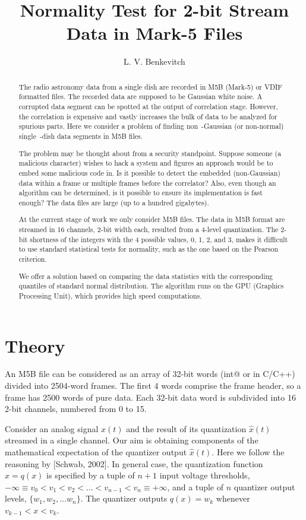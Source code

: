 \documentclass[letterpaper,twoside,12pt]{article}
\title{Normality Test for 2-bit Stream Data in Mark-5 Files}
\author[1]{L. V. Benkevitch}
\affil[1]{\small MIT Haystack observatory, Westford, MA 01886, USA.}
\begin{document}
\maketitle

\begin{abstract}
The radio astronomy data from a single dish are recorded in M5B (Mark-5) or VDIF formatted files. The recorded data are supposed to be Gaussian white noise. A corrupted data segment can be spotted at the output of correlation stage. However, the correlation is expensive and vastly increases the bulk of data to be analyzed for spurious parts. Here we consider a problem of finding non~-Gaussian (or non-normal) single~-dish data segments in M5B files.

The problem may be thought about from a security standpoint. Suppose someone (a malicious character) wishes to hack a system and figures an approach would be to embed some malicious code in. Is it possible to detect the embedded (non-Gaussian) data within a frame or multiple frames before the correlator? Also, even though an algorithm can be determined, is it possible to ensure its implementation is fast enough? The data files are large (up to a hundred gigabytes).

At the current stage of work we only consider M5B files. The data in M5B format are streamed in 16 channels, 2-bit width each, resulted from a 4-level quantization. The 2-bit shortness of the integers with the 4 possible values, 0, 1, 2, and 3, makes it difficult to use standard statistical tests for normality, such as the one based on the Pearson criterion.     
 
We offer a solution based on comparing the data statistics with the corresponding quantiles of standard normal distribution. The algorithm runs on the GPU (Graphics Processing Unit), which provides high speed computations.
\end{abstract}


\section{Theory}

An M5B file can be considered as an array of 32-bit words (\verb@unsigned int@ or  \verb@uint@ in C/C++) divided into 2504-word frames. The first 4 words comprise the frame header, so a frame has 2500 words of pure data. Each 32-bit data word is subdivided into 16 2-bit channels, numbered from 0 to 15. 

Consider an analog signal $x(t)$ and the result of its quantization $\hat{x}(t)$ streamed in a single channel. Our aim is obtaining components of the mathematical expectation of the quantizer output $\hat{x}(t)$. Here we follow the reasoning by [Schwab, 2002]. In general case, the quantization function $\hat{x} = q(x)$ is specified by a tuple of $n+1$ input voltage thresholds, 
$-\infty \equiv v_0 < v_1 < v_2 < \ldots  < v_{n-1} < v_n \equiv +\infty$, and a tuple of $n$ quantizer output levels, $\{ w_1, w_2, \ldots w_n \}$. The quantizer outputs $q(x) = w_k$ whenever $v_{k-1} < x < v_k$.
\end{document}
